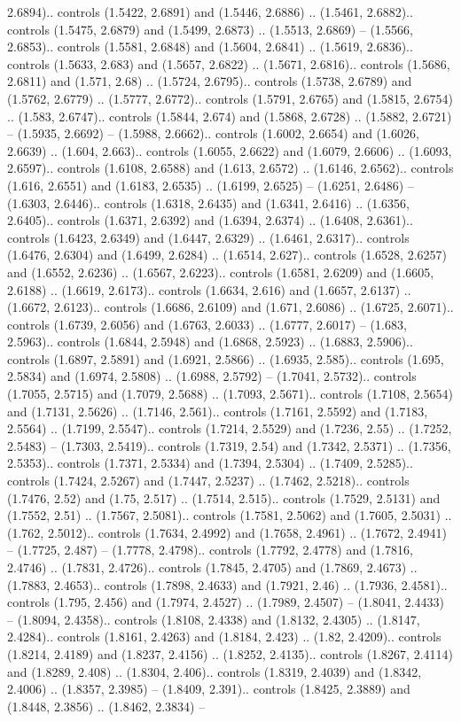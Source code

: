 2.6894).. controls (1.5422, 2.6891) and (1.5446, 2.6886) .. (1.5461, 2.6882).. controls (1.5475, 2.6879) and (1.5499, 2.6873) .. (1.5513, 2.6869) -- (1.5566, 2.6853).. controls (1.5581, 2.6848) and (1.5604, 2.6841) .. (1.5619, 2.6836).. controls (1.5633, 2.683) and (1.5657, 2.6822) .. (1.5671, 2.6816).. controls (1.5686, 2.6811) and (1.571, 2.68) .. (1.5724, 2.6795).. controls (1.5738, 2.6789) and (1.5762, 2.6779) .. (1.5777, 2.6772).. controls (1.5791, 2.6765) and (1.5815, 2.6754) .. (1.583, 2.6747).. controls (1.5844, 2.674) and (1.5868, 2.6728) .. (1.5882, 2.6721) -- (1.5935, 2.6692) -- (1.5988, 2.6662).. controls (1.6002, 2.6654) and (1.6026, 2.6639) .. (1.604, 2.663).. controls (1.6055, 2.6622) and (1.6079, 2.6606) .. (1.6093, 2.6597).. controls (1.6108, 2.6588) and (1.613, 2.6572) .. (1.6146, 2.6562).. controls (1.616, 2.6551) and (1.6183, 2.6535) .. (1.6199, 2.6525) -- (1.6251, 2.6486) -- (1.6303, 2.6446).. controls (1.6318, 2.6435) and (1.6341, 2.6416) .. (1.6356, 2.6405).. controls (1.6371, 2.6392) and (1.6394, 2.6374) .. (1.6408, 2.6361).. controls (1.6423, 2.6349) and (1.6447, 2.6329) .. (1.6461, 2.6317).. controls (1.6476, 2.6304) and (1.6499, 2.6284) .. (1.6514, 2.627).. controls (1.6528, 2.6257) and (1.6552, 2.6236) .. (1.6567, 2.6223).. controls (1.6581, 2.6209) and (1.6605, 2.6188) .. (1.6619, 2.6173).. controls (1.6634, 2.616) and (1.6657, 2.6137) .. (1.6672, 2.6123).. controls (1.6686, 2.6109) and (1.671, 2.6086) .. (1.6725, 2.6071).. controls (1.6739, 2.6056) and (1.6763, 2.6033) .. (1.6777, 2.6017) -- (1.683, 2.5963).. controls (1.6844, 2.5948) and (1.6868, 2.5923) .. (1.6883, 2.5906).. controls (1.6897, 2.5891) and (1.6921, 2.5866) .. (1.6935, 2.585).. controls (1.695, 2.5834) and (1.6974, 2.5808) .. (1.6988, 2.5792) -- (1.7041, 2.5732).. controls (1.7055, 2.5715) and (1.7079, 2.5688) .. (1.7093, 2.5671).. controls (1.7108, 2.5654) and (1.7131, 2.5626) .. (1.7146, 2.561).. controls (1.7161, 2.5592) and (1.7183, 2.5564) .. (1.7199, 2.5547).. controls (1.7214, 2.5529) and (1.7236, 2.55) .. (1.7252, 2.5483) -- (1.7303, 2.5419).. controls (1.7319, 2.54) and (1.7342, 2.5371) .. (1.7356, 2.5353).. controls (1.7371, 2.5334) and (1.7394, 2.5304) .. (1.7409, 2.5285).. controls (1.7424, 2.5267) and (1.7447, 2.5237) .. (1.7462, 2.5218).. controls (1.7476, 2.52) and (1.75, 2.517) .. (1.7514, 2.515).. controls (1.7529, 2.5131) and (1.7552, 2.51) .. (1.7567, 2.5081).. controls (1.7581, 2.5062) and (1.7605, 2.5031) .. (1.762, 2.5012).. controls (1.7634, 2.4992) and (1.7658, 2.4961) .. (1.7672, 2.4941) -- (1.7725, 2.487) -- (1.7778, 2.4798).. controls (1.7792, 2.4778) and (1.7816, 2.4746) .. (1.7831, 2.4726).. controls (1.7845, 2.4705) and (1.7869, 2.4673) .. (1.7883, 2.4653).. controls (1.7898, 2.4633) and (1.7921, 2.46) .. (1.7936, 2.4581).. controls (1.795, 2.456) and (1.7974, 2.4527) .. (1.7989, 2.4507) -- (1.8041, 2.4433) -- (1.8094, 2.4358).. controls (1.8108, 2.4338) and (1.8132, 2.4305) .. (1.8147, 2.4284).. controls (1.8161, 2.4263) and (1.8184, 2.423) .. (1.82, 2.4209).. controls (1.8214, 2.4189) and (1.8237, 2.4156) .. (1.8252, 2.4135).. controls (1.8267, 2.4114) and (1.8289, 2.408) .. (1.8304, 2.406).. controls (1.8319, 2.4039) and (1.8342, 2.4006) .. (1.8357, 2.3985) -- (1.8409, 2.391).. controls (1.8425, 2.3889) and (1.8448, 2.3856) .. (1.8462, 2.3834) -- 